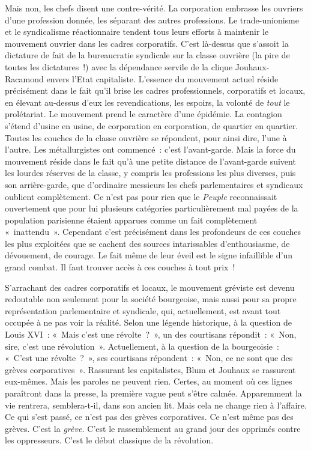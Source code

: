 \documentclass[french,twoside]{book} %
\begin{document}
Mais non, les chefs disent une contre-vérité. La corporation embrasse les ouvriers d’une profession donnée, les séparant des autres professions. Le trade-unionisme et le syndicalisme réactionnaire tendent tous leurs efforts à maintenir le mouvement ouvrier dans les cadres corporatifs. C’est là-dessus que s’assoit la dictature de fait de la bureaucratie syndicale sur la classe ouvrière (la pire de toutes les dictatures !) avec la dépendance servile de la clique Jouhaux-Racamond envers l’Etat capitaliste. L’essence du mouvement actuel réside précisément dans le fait qu’il brise les cadres professionnels, corporatifs et locaux, en élevant au-dessus d’eux les revendications, les espoirs, la volonté de \emph{tout} le prolétariat. Le mouvement prend le caractère d’une épidémie. La contagion s’étend d’usine en usine, de corporation en corporation, de quartier en quartier. Toutes les couches de la classe ouvrière se répondent, pour ainsi dire, l’une à l’autre. Les métallurgistes ont commencé : c’est l’avant-garde. Mais la force du mouvement réside dans le fait qu’à une petite distance de l’avant-garde suivent les lourdes réserves de la classe, y compris les professions les plus diverses, puis son arrière-garde, que d’ordinaire messieurs les chefs parlementaires et syndicaux oublient complètement. Ce n’est pas pour rien que le \emph{Peuple} reconnaissait ouvertement que pour lui plusieurs catégories particulièrement mal payées de la population parisienne étaient apparues comme un fait complètement « inattendu ». Cependant c’est précisément dans les profondeurs de ces couches les plus exploitées que  se cachent des sources intarissables d’enthousiasme, de dévouement, de courage. Le fait même de leur éveil est le signe infaillible d’un grand combat. Il faut trouver accès à ces couches à tout prix !\par
S’arrachant des cadres corporatifs et locaux, le mouvement gréviste est devenu redoutable non seulement pour la société bourgeoise, mais aussi pour sa propre représentation parlementaire et syndicale, qui, actuellement, est avant tout occupée à ne pas voir la réalité. Selon une légende historique, à la question de Louis XVI : « Mais c’est une révolte ? », un des courtisans répondit : « Non, sire, c’est une révolution ». Actuellement, à la question de la bourgeoisie : « C’est une révolte ? », ses courtisans répondent : « Non, ce ne sont que des grèves corporatives ». Rassurant les capitalistes, Blum et Jouhaux se rassurent eux-mêmes. Mais les paroles ne peuvent rien. Certes, au moment où ces lignes paraîtront dans la presse, la première vague peut s’être calmée. Apparemment la vie rentrera, semblera-t-il, dans son ancien lit. Mais cela ne change rien à l’affaire. Ce qui s’est passé, ce n’est pas des grèves corporatives. Ce n’est même pas des grèves. C’est la \emph{grève.} C’est le rassemblement au grand jour des opprimés contre les oppresseurs. C’est le début classique de la révolution.\par
\end{document}
